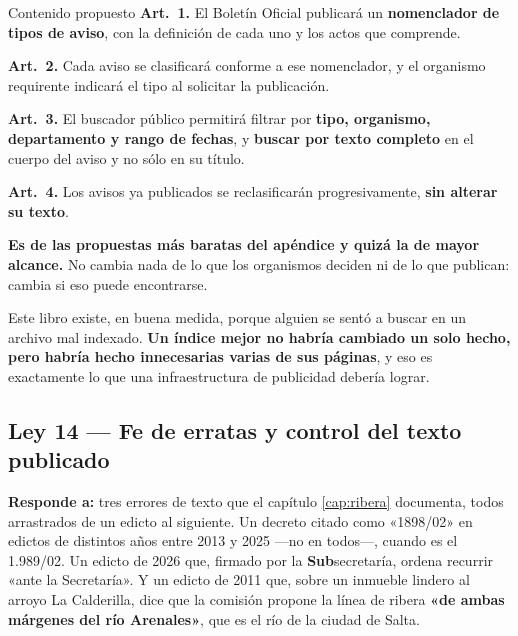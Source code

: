 \begin{ficha}{Contenido propuesto}
\textbf{Art.\ 1.} El Boletín Oficial publicará un \textbf{nomenclador de tipos de aviso}, con
la definición de cada uno y los actos que comprende.

\textbf{Art.\ 2.} Cada aviso se clasificará conforme a ese nomenclador, y el organismo
requirente indicará el tipo al solicitar la publicación.

\textbf{Art.\ 3.} El buscador público permitirá filtrar por \textbf{tipo, organismo,
departamento y rango de fechas}, y \textbf{buscar por texto completo} en el cuerpo del aviso y
no sólo en su título.

\textbf{Art.\ 4.} Los avisos ya publicados se reclasificarán progresivamente, \textbf{sin
alterar su texto}.
\end{ficha}

\begin{cautela}
\textbf{Es de las propuestas más baratas del apéndice y quizá la de mayor alcance.} No cambia nada de
lo que los organismos deciden ni de lo que publican: cambia si eso puede encontrarse.

Este libro existe, en buena medida, porque alguien se sentó a buscar en un archivo mal
indexado. \textbf{Un índice mejor no habría cambiado un solo hecho, pero habría hecho
innecesarias varias de sus páginas}, y eso es exactamente lo que una
infraestructura de publicidad debería lograr.
\end{cautela}

\subsection{Ley 14 --- Fe de erratas y control del texto publicado}

\textbf{Responde a:} tres errores de texto que el capítulo \ref{cap:ribera} documenta, todos arrastrados de un
edicto al siguiente. Un decreto citado como «1898/02» en edictos de distintos años entre 2013 y 2025 ---no en todos---, cuando es el
1.989/02. Un edicto de 2026 que, firmado por la \textbf{Sub}secretaría, ordena recurrir «ante la
Secretaría». Y un edicto de 2011 que, sobre un inmueble lindero al arroyo La Calderilla, dice
que la comisión propone la línea de ribera \textbf{«de ambas márgenes del río Arenales»}, que
es el río de la ciudad de Salta.

